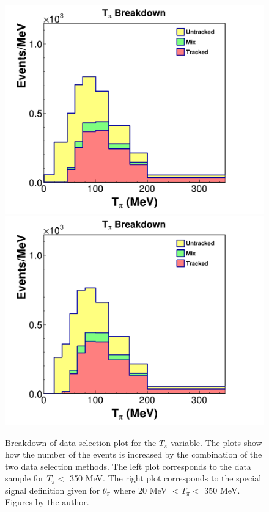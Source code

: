 \begin{figure}
    \centering
    \includegraphics[scale=0.21]{Figures/Chapter4/DataSelection/Stacked_Tpi_mixed_tpiweight.png}
    \includegraphics[scale=0.21]{Figures/Chapter4/DataSelection/Stacked_Tpi_thetapi_tpiweight.png}
    \caption{Breakdown of data selection plot for the $T_\pi$ variable. The plots show how the number of the events is increased by the combination of the two data selection methods. The left plot corresponds to the data sample for $T_\pi <$ 350 MeV. The right plot corresponds to the special signal definition given for $\theta_\pi$ where 20 MeV $<T_\pi<$ 350 MeV. Figures by the author.}
    \label{fig:Analysis:Cuts:DataSelBreakdown}
\end{figure}

